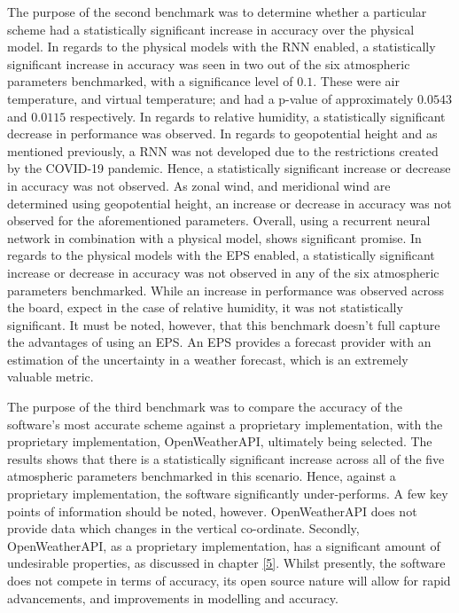The purpose of the second benchmark was to determine whether a particular scheme had a statistically significant increase in accuracy over the physical model. In regards to the physical models with the RNN enabled, a statistically significant increase in accuracy was seen in two out of the six atmospheric parameters benchmarked, with a significance level of $0.1$. These were air temperature, and virtual temperature; and had a p-value of approximately $0.0543$ and $0.0115$ respectively. In regards to relative humidity, a statistically significant decrease in performance was observed. In regards to geopotential height and as mentioned previously, a RNN was not developed due to the restrictions created by the COVID-19 pandemic. Hence, a statistically significant increase or decrease in accuracy was not observed. As zonal wind, and meridional wind are determined using geopotential height, an increase or decrease in accuracy was not observed for the aforementioned parameters. Overall, using a recurrent neural network in combination with a physical model, shows significant promise. In regards to the physical models with the EPS enabled, a statistically significant increase or decrease in accuracy was not observed in any of the six atmospheric parameters benchmarked. While an increase in performance was observed across the board, expect in the case of relative humidity, it was not statistically significant. It must be noted, however, that this benchmark doesn't full capture the advantages of using an EPS. An EPS provides a forecast provider with an estimation of the uncertainty in a weather forecast, which is an extremely valuable metric.

The purpose of the third benchmark was to compare the accuracy of the software's most accurate scheme against a proprietary implementation, with the proprietary implementation, OpenWeatherAPI, ultimately being selected. The results shows that there is a statistically significant increase across all of the five atmospheric parameters benchmarked in this scenario. Hence, against a proprietary implementation, the software significantly under-performs. A few key points of information should be noted, however. OpenWeatherAPI does not provide data which changes in the vertical co-ordinate. Secondly, OpenWeatherAPI, as a proprietary implementation, has a significant amount of undesirable properties, as discussed in chapter \ref{5}. Whilst presently, the software does not compete in terms of accuracy, its open source nature will allow for rapid advancements, and improvements in modelling and accuracy. 

